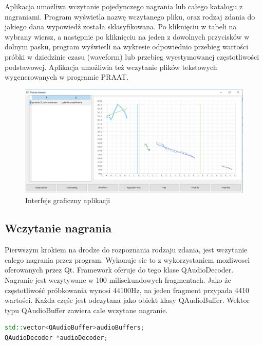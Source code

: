 \documentclass[a4paper,12 pt]{article}
\begin{document}
Aplikacja umożliwa wczytanie pojedynczego nagrania lub całego katalogu z nagraniami. Program wyświetla nazwę wczytanego pliku, oraz rodzaj zdania do jakiego dana wypowiedź została sklasyfikowana. Po kliknięciu w tabeli na wybrany wiersz, a następnie po kliknięciu na jeden z dowolnych przycisków w dolnym pasku, program wyświetli na wykresie odpowiednio przebieg wartości próbki w dziedzinie czasu (waveform) lub przebieg wyestymowanej częstotliwości podstawowej. Aplikacja umożliwia też wczytanie plików tekstowych wygenerowanych w programie PRAAT.
\begin{figure}[h]

\includegraphics[scale=0.5]{gui.png}
\caption{Interfejs graficzny aplikacji}
\end{figure}
\FloatBarrier
\subsection{Wczytanie nagrania}
Pierwszym krokiem na drodze do rozpoznania rodzaju zdania, jest wczytanie calego nagrania przez program. Wykonuje sie to z wykorzystaniem mozliwosci oferowanych przez Qt. Framework oferuje do tego klase QAudioDecoder. 
Nagranie jest wczytywane w 100 milisekundowych fragmentach. Jako że częstotliwość próbkowania wynosi 44100Hz, na jeden fragment przypada 4410 wartości. Każda częśc jest odczytana jako obiekt klasy QAudioBuffer. Wektor typu QAudioBuffer zawiera cale wczytane nagranie.
\begin{lstlisting}[caption={Połączenie sygnałów niosących informacje o starcie lub zakończeniu wczytywania nagrania, ze slotami},label={lst:label},language=C++]
std::vector<QAudioBuffer>audioBuffers;
QAudioDecoder *audioDecoder;
\end{lstlisting}
\end{document}
